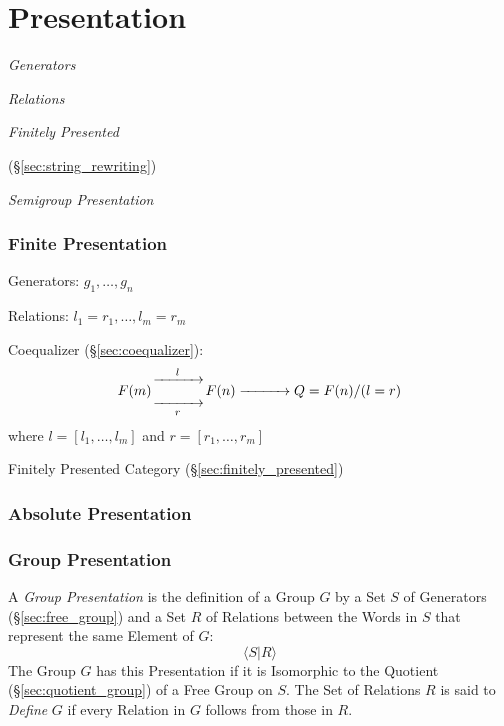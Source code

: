 \section{Presentation}\label{sec:presentation}

\emph{Generators}

\emph{Relations}

\emph{Finitely Presented}

(\S\ref{sec:string_rewriting})

\emph{Semigroup Presentation}



\subsubsection{Finite Presentation}\label{sec:finite_presentation}
\cite{awodey06}

Generators: $g_1, \ldots, g_n$

Relations: $l_1 = r_1, \ldots, l_m = r_m$

Coequalizer (\S\ref{sec:coequalizer}):
\[
  F(m) {\xrightarrow[\quad\quad\quad]{l}
    \atop \xrightarrow[r]{\quad\quad\quad}} F(n)
  \xrightarrow{\quad\quad\quad} Q = F(n) / (l = r)
\]
where $l = [l_1, \ldots, l_m]$ and $r = [r_1, \ldots, r_m]$

Finitely Presented Category (\S\ref{sec:finitely_presented})



\subsubsection{Absolute Presentation}\label{sec:absolute_presentation}

\subsubsection{Group Presentation}\label{sec:group_presentation}

A \emph{Group Presentation} is the definition of a Group $G$ by a Set
$S$ of Generators (\S\ref{sec:free_group}) and a Set $R$ of Relations
between the Words in $S$ that represent the same Element of $G$:
\[
  \langle S | R \rangle
\]
The Group $G$ has this Presentation if it is Isomorphic to the
Quotient (\S\ref{sec:quotient_group}) of a Free Group on $S$. The Set
of Relations $R$ is said to \emph{Define} $G$ if every Relation in $G$
follows from those in $R$.



